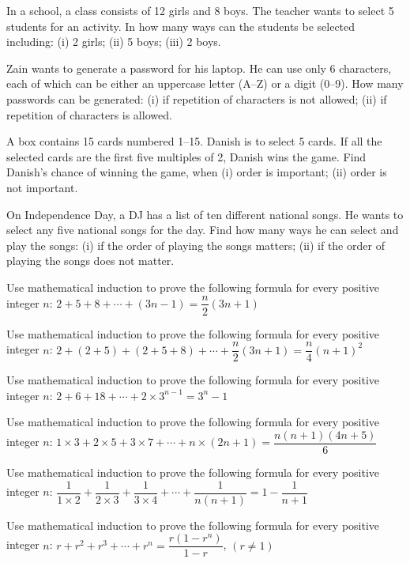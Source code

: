 \documentclass[11pt,a4paper]{article}
\begin{document}
\begin{longlist}
\item In a school, a class consists of 12 girls and 8 boys. The teacher wants to select 5 students for an activity. In how many ways can the students be selected including: (i) 2 girls; (ii) 5 boys; (iii) 2 boys.

\item Zain wants to generate a password for his laptop. He can use only 6 characters, each of which can be either an uppercase letter (A--Z) or a digit (0--9). How many passwords can be generated: (i) if repetition of characters is not allowed; (ii) if repetition of characters is allowed.

\item A box contains 15 cards numbered 1--15. Danish is to select 5 cards. If all the selected cards are the first five multiples of 2, Danish wins the game. Find Danish's chance of winning the game, when (i) order is important; (ii) order is not important.

\item On Independence Day, a DJ has a list of ten different national songs. He wants to select any five national songs for the day. Find how many ways he can select and play the songs: (i) if the order of playing the songs matters; (ii) if the order of playing the songs does not matter.

\item Use mathematical induction to prove the following formula for every positive integer $n$: $2+5+8+\cdots+(3n-1)=\dfrac{n}{2}(3n+1)$

\item Use mathematical induction to prove the following formula for every positive integer $n$: $2+(2+5)+(2+5+8)+\cdots+\dfrac{n}{2}(3n+1)=\dfrac{n}{4}(n+1)^2$

\item Use mathematical induction to prove the following formula for every positive integer $n$: $2+6+18+\cdots+2\times 3^{n-1}=3^n-1$

\item Use mathematical induction to prove the following formula for every positive integer $n$: $1\times3+2\times5+3\times7+\cdots+n\times(2n+1)=\dfrac{n(n+1)(4n+5)}{6}$

\item Use mathematical induction to prove the following formula for every positive integer $n$: $\dfrac{1}{1\times2}+\dfrac{1}{2\times3}+\dfrac{1}{3\times4}+\cdots+\dfrac{1}{n(n+1)}=1-\dfrac{1}{n+1}$

\item Use mathematical induction to prove the following formula for every positive integer $n$: $r+r^2+r^3+\cdots+r^n=\dfrac{r(1-r^n)}{1-r}$, $(r\neq 1)$


\end{longlist}
\end{document}
